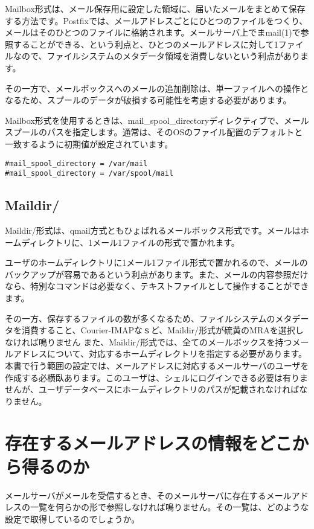 Mailbox形式は、メール保存用に設定した領域に、届いたメールをまとめて保存する方法です。Postfixでは、メールアドレスごとにひとつのファイルをつくり、メールはそのひとつのファイルに格納されます。メールサーバ上でまmail(1)で参照することができる、という利点と、ひとつのメールアドレスに対して1ファイルなので、ファイルシステムのメタデータ領域を消費しないという利点があります。

その一方で、メールボックスへのメールの追加削除は、単一ファイルへの操作となるため、スプールのデータが破損する可能性を考慮する必要があります。

Mailbox形式を使用するときは、mail\_spool\_directoryディレクティブで、メールスプールのパスを指定します。通常は、そのOSのファイル配置のデフォルトと一致するように初期値が設定されています。

\begin{lstlisting}[basicstyle=\ttfamily\footnotesize, frame=single]
#mail_spool_directory = /var/mail
#mail_spool_directory = /var/spool/mail
\end{lstlisting}

\subsection{Maildir/}
Maildir/形式は、qmail方式ともひょばれるメールボックス形式です。メールはホームディレクトリに、1メール1ファイルの形式で置かれます。

ユーザのホームディレクトリに1メール1ファイル形式で置かれるので、メールのバックアップが容易であるという利点があります。また、メールの内容参照だけなら、特別なコマンドは必要なく、テキストファイルとして操作することができます。

その一方、保存するファイルの数が多くなるため、ファイルシステムのメタデータを消費すること、Courier-IMAPなｓど、Maildir/形式が硫黄のMRAを選択しなければ鳴りません
また、Maildir/形式では、全てのメールボックスを持つメールアドレスについて、対応するホームディレクトリを指定する必要があります。
本書で行う範囲の設定では、メールアドレスに対応するメールサーバのユーザを作成する必横臥あります。このユーザは、シェルにログインできる必要は有りませんが、ユーザデータベースにホームディレクトリのパスが記載されなければなりません。

\section{存在するメールアドレスの情報をどこから得るのか}
メールサーバがメールを受信するとき、そのメールサーバに存在するメールアドレスの一覧を何らかの形で参照しなければ鳴りません。その一覧は、どのような設定で取得しているのでしょうか。

